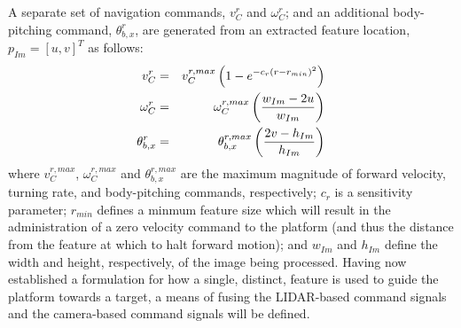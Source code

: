 A separate set of navigation commands, $v_{C}^{r}$ and $\omega_{C}^{r}$; and an additional body-pitching command, $\theta_{b,x}^{r}$,  are generated from an extracted feature location, $p_{Im} = [u,v]^{T}$ as follows: 
	\begin{eqnarray}
		v_{C}^{r} 			& = & v_{C}^{r,max} \left( 1 - e^{ -c_{r} \left( r-r_{min} \right)^{2} } \right) 	\nonumber 	\\
		\omega_{C}^{r} 	& = & \omega_{C}^{r,max} \left(\frac{ w_{Im} - 2 u  }{ w_{Im} } \right)		\nonumber 	\\
		\theta_{b,x}^{r}	& = & \theta_{b,x}^{r,max} \left( \frac{ 2 v - h_{Im} }{ h_{Im} } \right) 		
	\end{eqnarray}
	where $v_{C}^{r,max}$, $\omega_{C}^{r,max}$ and $\theta_{b,x}^{r,max}$ are the maximum magnitude of forward velocity, turning rate, and body-pitching commands, respectively; $c_{r}$ is a sensitivity parameter; $r_{min}$ defines a minmum feature size which will result in the administration of a zero velocity command to the platform (and thus the distance from the feature at which to halt forward motion); and $w_{Im}$ and $h_{Im}$ define the width and height, respectively, of the image being processed. Having now established a formulation for how a single, distinct, feature is used to guide the platform towards a target, a means of fusing the LIDAR-based command signals and the camera-based command signals will be defined.

